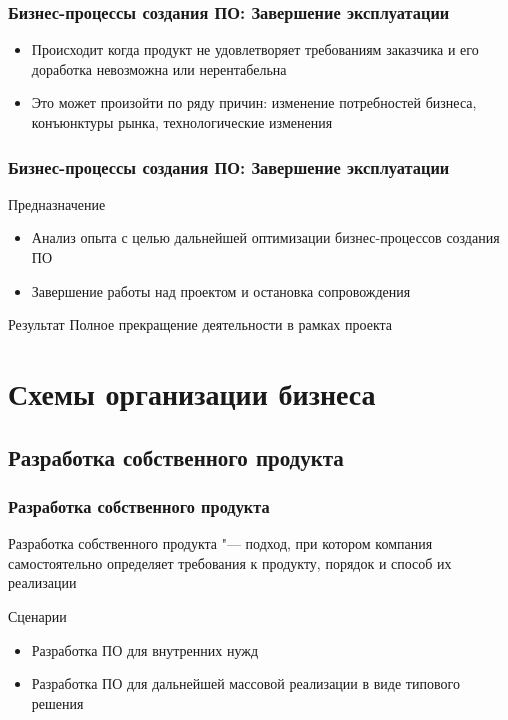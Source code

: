 \documentclass{../industrial-development}
\begin{document}
\begin{frame} \frametitle{Бизнес-процессы создания ПО: Завершение эксплуатации}
	\begin{itemize}
		\item Происходит когда продукт не удовлетворяет требованиям заказчика и его доработка невозможна или нерентабельна
		\item Это может произойти по ряду причин: изменение потребностей бизнеса, конъюнктуры рынка, технологические изменения
	\end{itemize}
\end{frame}


\begin{frame} \frametitle{Бизнес-процессы создания ПО: Завершение эксплуатации}
	\begin{block}{Предназначение}
		\begin{itemize}
			\item Анализ опыта с целью дальнейшей оптимизации бизнес-процессов создания ПО
			\item Завершение работы над проектом и остановка сопровождения
		\end{itemize}
	\end{block}
	\begin{block}{Результат}
		Полное прекращение деятельности в рамках проекта
	\end{block}
\end{frame}


\section{Схемы организации бизнеса}

\subsection{Разработка собственного продукта}


\begin{frame} \frametitle{Разработка собственного продукта}
	\begin{block}{}
		\alert{Разработка собственного продукта} "--- подход, при котором компания самостоятельно определяет требования к продукту, порядок и способ их реализации
	\end{block}
	\begin{block}{Сценарии}
		\begin{itemize}
			\item Разработка ПО для внутренних нужд
			\item Разработка ПО для дальнейшей массовой реализации в виде типового решения
		\end{itemize}
	\end{block}
\end{frame}
\end{document}
